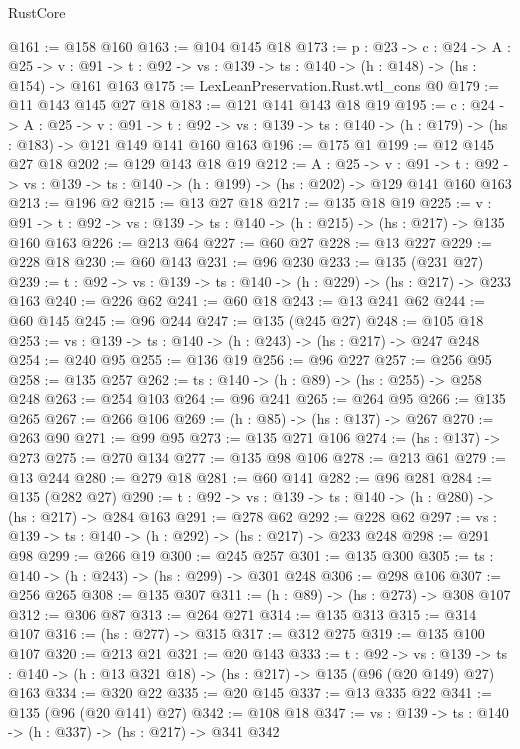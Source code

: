 \begin{lexlean}{RustCore}
\begin{coremodule}
@161 := @158 @160
@163 := @104 @145 @18
@173 := {p : @23} ->
  {c : @24} ->
  {A : @25} ->
  {v : @91} -> {t : @92} -> {vs : @139} -> {ts : @140} -> (h : @148) -> (hs : @154) -> @161 @163
@175 := LexLeanPreservation.Rust.wtl_cons @0
@179 := @11 @143 @145 @27 @18
@183 := @121 @141 @143 @18 @19
@195 := {c : @24} ->
  {A : @25} ->
  {v : @91} ->
  {t : @92} -> {vs : @139} -> {ts : @140} -> (h : @179) -> (hs : @183) -> @121 @149 @141 @160 @163
@196 := @175 @1
@199 := @12 @145 @27 @18
@202 := @129 @143 @18 @19
@212 := {A : @25} ->
  {v : @91} ->
  {t : @92} -> {vs : @139} -> {ts : @140} -> (h : @199) -> (hs : @202) -> @129 @141 @160 @163
@213 := @196 @2
@215 := @13 @27 @18
@217 := @135 @18 @19
@225 := {v : @91} ->
  {t : @92} -> {vs : @139} -> {ts : @140} -> (h : @215) -> (hs : @217) -> @135 @160 @163
@226 := @213 @64
@227 := @60 @27
@228 := @13 @227
@229 := @228 @18
@230 := @60 @143
@231 := @96 @230
@233 := @135 (@231 @27)
@239 := {t : @92} -> {vs : @139} -> {ts : @140} -> (h : @229) -> (hs : @217) -> @233 @163
@240 := @226 @62
@241 := @60 @18
@243 := @13 @241 @62
@244 := @60 @145
@245 := @96 @244
@247 := @135 (@245 @27)
@248 := @105 @18
@253 := {vs : @139} -> {ts : @140} -> (h : @243) -> (hs : @217) -> @247 @248
@254 := @240 @95
@255 := @136 @19
@256 := @96 @227
@257 := @256 @95
@258 := @135 @257
@262 := {ts : @140} -> (h : @89) -> (hs : @255) -> @258 @248
@263 := @254 @103
@264 := @96 @241
@265 := @264 @95
@266 := @135 @265
@267 := @266 @106
@269 := (h : @85) -> (hs : @137) -> @267
@270 := @263 @90
@271 := @99 @95
@273 := @135 @271 @106
@274 := (hs : @137) -> @273
@275 := @270 @134
@277 := @135 @98 @106
@278 := @213 @61
@279 := @13 @244
@280 := @279 @18
@281 := @60 @141
@282 := @96 @281
@284 := @135 (@282 @27)
@290 := {t : @92} -> {vs : @139} -> {ts : @140} -> (h : @280) -> (hs : @217) -> @284 @163
@291 := @278 @62
@292 := @228 @62
@297 := {vs : @139} -> {ts : @140} -> (h : @292) -> (hs : @217) -> @233 @248
@298 := @291 @98
@299 := @266 @19
@300 := @245 @257
@301 := @135 @300
@305 := {ts : @140} -> (h : @243) -> (hs : @299) -> @301 @248
@306 := @298 @106
@307 := @256 @265
@308 := @135 @307
@311 := (h : @89) -> (hs : @273) -> @308 @107
@312 := @306 @87
@313 := @264 @271
@314 := @135 @313
@315 := @314 @107
@316 := (hs : @277) -> @315
@317 := @312 @275
@319 := @135 @100 @107
@320 := @213 @21
@321 := @20 @143
@333 := {t : @92} ->
  {vs : @139} -> {ts : @140} -> (h : @13 @321 @18) -> (hs : @217) -> @135 (@96 (@20 @149) @27) @163
@334 := @320 @22
@335 := @20 @145
@337 := @13 @335 @22
@341 := @135 (@96 (@20 @141) @27)
@342 := @108 @18
@347 := {vs : @139} -> {ts : @140} -> (h : @337) -> (hs : @217) -> @341 @342

\end{coremodule}
\end{lexlean}

